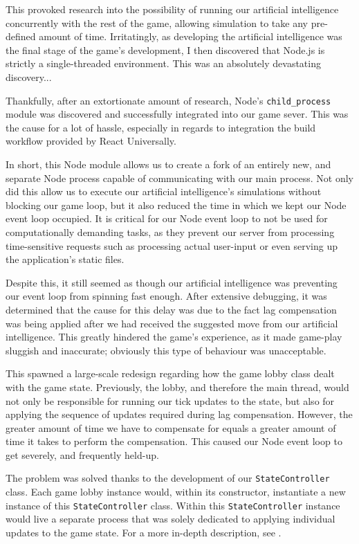 \documentclass{standalone}
\begin{document}
			This provoked research into the possibility of running our artificial intelligence concurrently with the rest of the game, allowing simulation to take any pre-defined amount of time. Irritatingly, as developing the artificial intelligence was the final stage of the game's development, I then discovered that Node.js is strictly a single-threaded environment. This was an absolutely devastating discovery...

			Thankfully, after an extortionate amount of research, Node's \texttt{child\_process} module \parencite{nodeChildProcess} was discovered and successfully integrated into our game sever. This was the cause for a lot of hassle, especially in regards to integration the build workflow provided by React Universally.

			In short, this Node module allows us to create a fork of an entirely new, and separate Node process capable of communicating with our main process. Not only did this allow us to execute our artificial intelligence's simulations without blocking our game loop, but it also reduced the time in which we kept our Node event loop occupied. It is critical for our Node event loop to not be used for computationally demanding tasks, as they prevent our server from processing time-sensitive requests such as processing actual user-input or even serving up the application's static files.

			Despite this, it still seemed as though our artificial intelligence was preventing our event loop from spinning fast enough. After extensive debugging, it was determined that the cause for this delay was due to the fact lag compensation was being applied after we had received the suggested move from our artificial intelligence. This greatly hindered the game's experience, as it made game-play sluggish and inaccurate; obviously this type of behaviour was unacceptable.

			This spawned a large-scale redesign regarding how the game lobby class dealt with the game state. Previously, the lobby, and therefore the main thread, would not only be responsible for running our tick updates to the state, but also for applying the sequence of updates required during lag compensation. However, the greater amount of time we have to compensate for equals a greater amount of time it takes to perform the compensation. This caused our Node event loop to get severely, and frequently held-up.

			The problem was solved thanks to the development of our \texttt{StateController} class. Each game lobby instance would, within its constructor, instantiate a new instance of this \texttt{StateController} class. Within this \texttt{StateController} instance would live a separate process that was solely dedicated to applying individual updates to the game state. For a more in-depth description, see .
\end{document}
